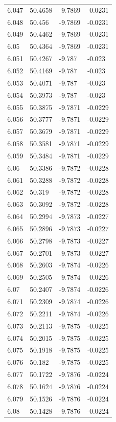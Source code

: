 \begin{tabular}{llll}
6.047 & 50.4658 & -9.7869 & -0.0231 \\
6.048 & 50.456 & -9.7869 & -0.0231 \\
6.049 & 50.4462 & -9.7869 & -0.0231 \\
6.05 & 50.4364 & -9.7869 & -0.0231 \\
6.051 & 50.4267 & -9.787 & -0.023 \\
6.052 & 50.4169 & -9.787 & -0.023 \\
6.053 & 50.4071 & -9.787 & -0.023 \\
6.054 & 50.3973 & -9.787 & -0.023 \\
6.055 & 50.3875 & -9.7871 & -0.0229 \\
6.056 & 50.3777 & -9.7871 & -0.0229 \\
6.057 & 50.3679 & -9.7871 & -0.0229 \\
6.058 & 50.3581 & -9.7871 & -0.0229 \\
6.059 & 50.3484 & -9.7871 & -0.0229 \\
6.06 & 50.3386 & -9.7872 & -0.0228 \\
6.061 & 50.3288 & -9.7872 & -0.0228 \\
6.062 & 50.319 & -9.7872 & -0.0228 \\
6.063 & 50.3092 & -9.7872 & -0.0228 \\
6.064 & 50.2994 & -9.7873 & -0.0227 \\
6.065 & 50.2896 & -9.7873 & -0.0227 \\
6.066 & 50.2798 & -9.7873 & -0.0227 \\
6.067 & 50.2701 & -9.7873 & -0.0227 \\
6.068 & 50.2603 & -9.7874 & -0.0226 \\
6.069 & 50.2505 & -9.7874 & -0.0226 \\
6.07 & 50.2407 & -9.7874 & -0.0226 \\
6.071 & 50.2309 & -9.7874 & -0.0226 \\
6.072 & 50.2211 & -9.7874 & -0.0226 \\
6.073 & 50.2113 & -9.7875 & -0.0225 \\
6.074 & 50.2015 & -9.7875 & -0.0225 \\
6.075 & 50.1918 & -9.7875 & -0.0225 \\
6.076 & 50.182 & -9.7875 & -0.0225 \\
6.077 & 50.1722 & -9.7876 & -0.0224 \\
6.078 & 50.1624 & -9.7876 & -0.0224 \\
6.079 & 50.1526 & -9.7876 & -0.0224 \\
6.08 & 50.1428 & -9.7876 & -0.0224 \\

\end{tabular}
